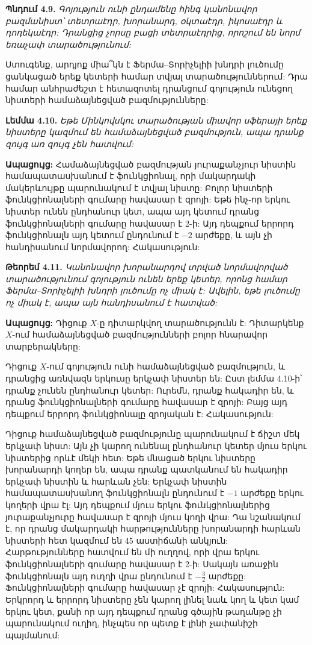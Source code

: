 \documentclass[12pt,a4paper]{article}
\numberwithin{equation}{section}
\numberwithin{figure}{section}
\begin{document}
\textbf{Պնդում 4.9.} \textit{Գոյություն ունի ընդամենը հինգ կանոնավոր բազմանիստ՝ տետրաէդր, խորանարդ, օկտաէդր, իկոսաէդր և դոդեկաէդր: Դրանցից չորսը բացի տետրաէդրից, որոշում են նորմ եռաչափ տարածությունում:}

Ստուգենք, արդյոք միա՞կն է Ֆերմա--Տորիչելիի խնդրի լուծումը ցանկացած երեք կետերի համար տվյալ տարածություններում: Դրա համար անհրաժեշտ է հետազոտել դրանցում գոյություն ունեցող նիստերի համաձայնեցված բազմությունները:

\textbf{Լեմմա 4.10.} \textit{Եթե Մինկովսկու տարածության միավոր սֆերայի երեք նիստերը կազմում են համաձայնեցված բազմություն, ապա դրանք զույգ առ զույգ չեն հատվում:}

\textbf{Ապացույց:} Համաձայնեցված բազմության յուրաքանչյուր նիստին համապատասխանում է ֆունկցիոնալ, որի մակարդակի մակերևույթը պարունակում է տվյալ նիստը: Բոլոր նիստերի ֆունկցիոնալների գումարը հավասար է զրոյի: Եթե ինչ-որ երկու նիստեր ունեն ընդհանուր կետ, ապա այդ կետում դրանց ֆունկցիոնալների գումարը հավասար է 2-ի: Այդ դեպքում երրորդ ֆունկցիոնալն այդ կետում ընդունում է $-2$ արժեքը, և այն չի հանդիսանում նորմավորող: Հակասություն: 

\textbf{Թեորեմ 4.11.} \textit{Կանոնավոր խորանարդով տրված նորմավորված տարածությունում գոյություն ունեն երեք կետեր, որոնց համար Ֆերմա--Տորիչելիի խնդրի լուծումը ոչ միակ է: Ավելին, եթե լուծումը ոչ միակ է, ապա այն հանդիսանում է հատված:}

\textbf{Ապացույց:} Դիցուք $X$-ը դիտարկվող տարածությունն է: Դիտարկենք $X$-ում համաձայնեցված բազմությունների բոլոր հնարավոր տարբերակները:

Դիցուք $X$-ում գոյություն ունի համաձայնեցված բազմություն, և դրանցից առնվազն երկուսը երկչափ նիստեր են: Ըստ լեմմա 4.10-ի՝ դրանք չունեն ընդհանուր կետեր: Ուրեմն, դրանք հակադիր են, և դրանց ֆունկցիոնալների գումարը հավասար է զրոյի: Բայց այդ դեպքում երրորդ ֆունկցիոնալը զրոյական է: Հակասություն:

Դիցուք համաձայնեցված բազմությունը պարունակում է ճիշտ մեկ երկչափ նիստ: Այն չի կարող ունենալ ընդհանուր կետեր մյուս երկու նիստերից որևէ մեկի հետ: Եթե մնացած երկու նիստերը խորանարդի կողեր են, ապա դրանք պատկանում են հակադիր երկչափ նիստին և հարևան չեն: Երկչափ նիստին համապատասխանող ֆունկցիոնալն ընդունում է $-1$ արժեքը երկու կողերի վրա էլ: Այդ դեպքում մյուս երկու ֆունկցիոնալներից յուրաքանչյուրը հավասար է զրոյի մյուս կողի վրա: Դա նշանակում է, որ դրանց մակարդակի հարթությունները խորանարդի հարևան նիստերի հետ կազմում են 45 աստիճանի անկյուն: Հարթությունները հատվում են մի ուղղով, որի վրա երկու ֆունկցիոնալների գումարը հավասար է 2-ի: Սակայն առաջին ֆունկցիոնալն այդ ուղղի վրա ընդունում է $-\frac{3}{2}$ արժեքը: Ֆունկցիոնալների գումարը հավասար չէ զրոյի: Հակասություն: Երկրորդ և երրորդ նիստերը չեն կարող լինել նաև կող և կետ կամ երկու կետ, քանի որ այդ դեպքում դրանց գծային թաղանթը չի պարունակում ուղիղ, ինչպես որ պետք է լինի չափանիշի պայմանում:
\end{document}
